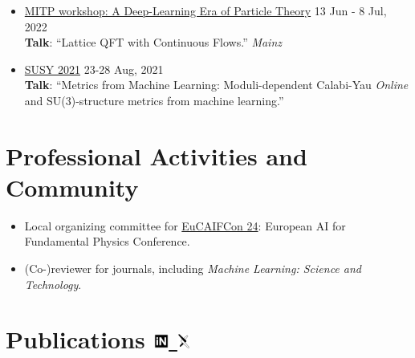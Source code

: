 \documentclass[11pt, letterpaper]{article}
\newcommand{\dateright}[1]{\hfill{\small\color{accentblue} #1}}
\begin{document}
\begin{itemize}[resume, itemsep=5pt]
    \item {\href{https://indico.mitp.uni-mainz.de/event/254/overview}{MITP workshop: A Deep-Learning Era of Particle Theory}} \dateright{ 13 Jun - 8 Jul, 2022} \\
    {\footnotesize \textbf{Talk}: “Lattice QFT with Continuous Flows.”} \dateright{{\color{black}\textit{Mainz}}}

    \item {\href{https://indico.cern.ch/event/875077/contributions/4481976/}{SUSY 2021}} \dateright{ 23-28 Aug, 2021} \\
    {\footnotesize \textbf{Talk}: “Metrics from Machine Learning: Moduli-dependent Calabi-Yau} \dateright{{\color{black}\textit{Online}}}\\
    {\footnotesize and SU(3)-structure metrics from machine learning.”}

\end{itemize}

\section*{Professional Activities and Community}
\begin{itemize}[left=0pt, itemsep=3pt]
    \item Local organizing committee for \href{https://www.aanmelder.nl/eucaifcon24}{EuCAIFCon 24}: European AI for Fundamental Physics Conference.
    \item (Co-)reviewer for journals, including \textit{Machine Learning: Science and Technology}.
\end{itemize}

\newpage
\section*{Publications \hfill
{ \small
\href{https://inspirehep.net/authors/2107097}{\includegraphics[height=14pt]{inspire.pdf} \hspace*{-7pt} } \hspace*{10pt}
\href{https://arxiv.org/a/gerdes_m_1.html}{\includegraphics[height=14pt]{arxiv.pdf} \hspace*{-10pt} }
}
}
\end{document}
